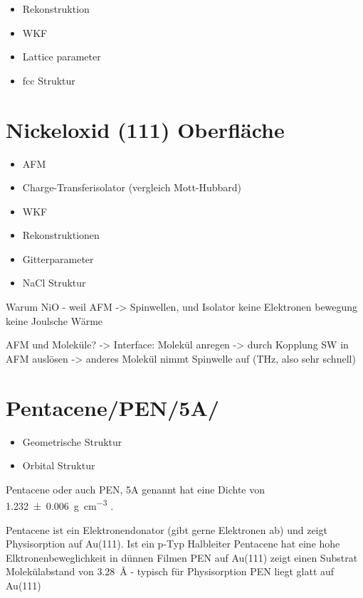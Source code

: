         \begin{itemize}
            \item Rekonstruktion
            \item WKF
            \item Lattice parameter
            \item fcc Struktur
        \end{itemize}


        \section{Nickeloxid (111) Oberfläche}
            \begin{itemize}
                \item AFM
                \item Charge-Transferisolator (vergleich Mott-Hubbard)
                \item WKF
                \item Rekonstruktionen
                \item Gitterparameter
                \item NaCl Struktur
            \end{itemize}
            Warum NiO - weil AFM -> Spinwellen, und Isolator keine Elektronen bewegung keine Joulsche Wärme

            AFM und Moleküle? -> Interface: Molekül anregen -> durch Kopplung SW in AFM auslösen -> anderes Molekül nimmt Spinwelle auf (THz, also sehr schnell)

    \section{Pentacene/PEN/5A/}
        \begin{itemize}
            \item Geometrische Struktur
            \item Orbital Struktur
        \end{itemize}
        Pentacene oder auch PEN, 5A genannt hat eine Dichte von \SI{1.232(6)}{\gram\per\cubic\centi\meter} \cite{CAS}.
        
        
        \textbf{\cite{5A_1}}
        Pentacene ist ein Elektronendonator (gibt gerne Elektronen ab) und zeigt Physisorption auf Au(111).
        Ist ein p-Typ Halbleiter
        Pentacene hat eine hohe Elktronenbeweglichkeit in dünnen Filmen
        PEN auf Au(111) zeigt einen Substrat Molekülabstand von \SI{3.28}{\angstrom} - typisch für Physisorption
        PEN liegt glatt auf Au(111)
    